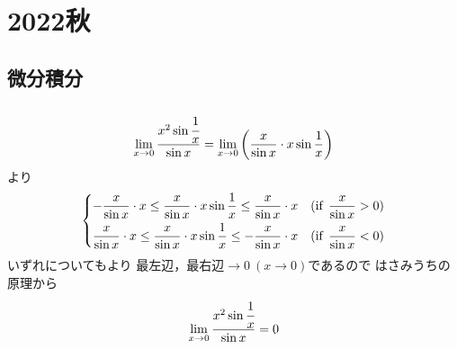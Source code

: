 \newpage
\section{2022秋}

\setcounter{yearcounter}{2022}


\subsection{微分積分}
\begin{ans*}
  ${}$
  \begin{gather}
    \lim_{x\to 0}\frac{x^2\sin\cfrac{1}{x}}{\sin x}
    = \lim_{x\to 0}\left(\frac{x}{\sin x}\cdot x\sin\frac{1}{x}\right)
  \end{gather}
  より
  \begin{gather}
    \begin{dcases}
      -\frac{x}{\sin x}\cdot x 
      \leq \frac{x}{\sin x}\cdot x\sin\frac{1}{x} 
      \leq \frac{x}{\sin x}\cdot x
      & (\text{if\:\:} \frac{x}{\sin x} > 0) \\
      \frac{x}{\sin x}\cdot x 
      \leq \frac{x}{\sin x}\cdot x\sin\frac{1}{x} 
      \leq -\frac{x}{\sin x}\cdot x 
      & (\text{if\:\:} \frac{x}{\sin x} < 0)
    \end{dcases}
  \end{gather}
  いずれについてもより
  最左辺，最右辺$\longrightarrow 0\:(x\to 0)$であるので
  はさみうちの原理から
  \begin{gather}
    \lim_{x\to 0}\frac{x^2 \sin \cfrac{1}{x}}{\sin x} = 0
  \end{gather}
\end{ans*}


